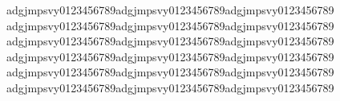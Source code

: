 \documentclass{article}
\begin{document}
\setlength\parindent{0pt}


\newcommand{\qq}{adgjmpsvy0123456789}
\newcommand{\q}{\qq\qq\qq}

\vspace*{-3.4mm}
{\Large \q}
{\large \q}
{\normalsize \q}
{\small \q}
{\scriptsize \q}
{\tiny \q}
\end{document}
